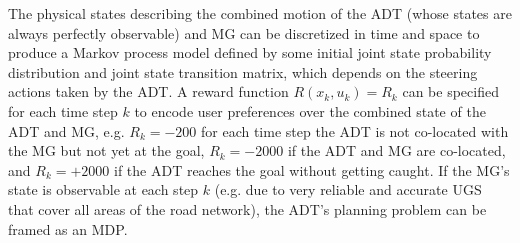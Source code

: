 The physical states describing the combined motion of the ADT (whose states are always perfectly observable) and MG can be discretized in time and space to produce a Markov process model defined by some initial joint state probability distribution and joint state transition matrix, which depends on the steering actions taken by the ADT. 
A reward function $R(x_k,u_k) = R_k$ can be specified for each time step $k$ to encode user preferences over the combined state of the ADT and MG, e.g. $R_k = -200$ for each time step the ADT is not co-located with the MG but not yet at the goal, $R_k= -2000$ if the ADT and MG are co-located, and $R_k=+2000$ if the ADT reaches the goal without getting caught. 
If the MG's state is observable at each step $k$ (e.g. due to very reliable and accurate UGS that cover all areas of the road network), the ADT's planning problem can be framed as an MDP. 
%
%
%
%
%

